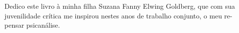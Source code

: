 \begingroup
\ifodd\thepage\relax\else\cleardoublepage\fi

\thispagestyle{empty}
\vspace*{.6\textheight}
\parindent0pt
\parskip6pt


\hfill\begin{minipage}{.7\textwidth}
\begin{flushleft}
Dedico este livro à minha filha Suzana Fanny Elwing Goldberg, que com
sua juvenilidade crítica me inspirou nestes anos de trabalho conjunto, o
meu re-pensar psicanálise.
\end{flushleft}
\end{minipage}

\endgroup
